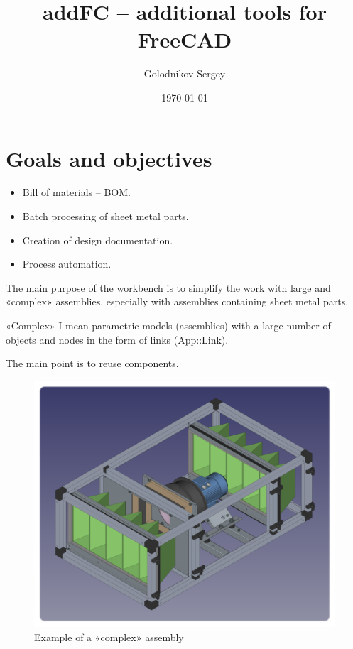 \documentclass[a4paper,12pt]{article}
\title{addFC -- additional tools for FreeCAD}
\author{Golodnikov Sergey}
\date{\today}
\begin{document}
\maketitle




\section{Goals and objectives}

\begin{itemize}
	\item Bill of materials -- BOM.
	\item Batch processing of sheet metal parts.
	\item Creation of design documentation.
	\item Process automation.\\
\end{itemize}

The main purpose of the workbench is to simplify the work with large and «complex» assemblies, especially with assemblies containing sheet metal parts.

«Complex» I mean parametric models (assemblies) with a large number of objects and nodes in the form of links (App::Link).

The main point is to reuse components.

\begin{figure}[htp]
	\centering
	\includegraphics[scale=0.48]{img/assembly_example.png}
	\caption{Example of a «complex» assembly}
	\label{sec:assembly_example}
\end{figure}
\end{document}
